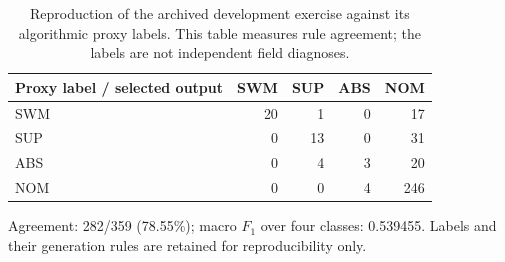 \begin{table}[htbp]
\centering\small
\caption{Reproduction of the archived development exercise against its algorithmic proxy labels. This table measures rule agreement; the labels are not independent field diagnoses.}
\label{tab:proxy-reproduction}
\begin{tabular}{lrrrr}\toprule
Proxy label / selected output & SWM & SUP & ABS & NOM\\\midrule
SWM & 20 & 1 & 0 & 17\\
SUP & 0 & 13 & 0 & 31\\
ABS & 0 & 4 & 3 & 20\\
NOM & 0 & 0 & 4 & 246\\
\bottomrule\end{tabular}
\par\smallskip\footnotesize Agreement: 282/359 (78.55\%); macro $F_1$ over four classes: 0.539455. Labels and their generation rules are retained for reproducibility only.
\end{table}
